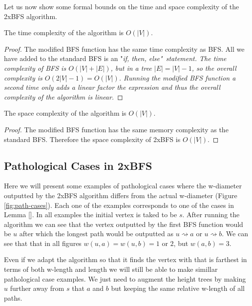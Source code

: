Let us now show some formal bounds on the time and space complexity of the 2xBFS algorithm.

\begin{lem} The time complexity of the algorithm is $O(|V|)$. \end{lem}

\begin{proof}
    The modified BFS function has the same time complexity as BFS. All we have added to the standard BFS is an "\em if, then, else\em"~statement. The time complexity of BFS is $O(|V| + |E|)$, but in a tree $|E| = |V| - 1$, so the overall complexity is $O(2|V| - 1) = O(|V|)$.
    Running the modified BFS function a second time only adds a linear factor the expression and thus the overall complexity of the algorithm is linear.
\end{proof}

\begin{lem} The space complexity of the algorithm is $O(|V|)$. \end{lem}

\begin{proof}
    The modified BFS function has the same memory complexity as the standard BFS. Therefore the space complexity of 2xBFS is $O(|V|)$.
\end{proof}

\subsection{Pathological Cases in 2xBFS}

Here we will present some examples of pathological cases where the w-diameter outputted by the 2xBFS algorithm differs from the actual w-diameter (Figure \ref{fig:path-cases}). Each one of the examples corresponds to one of the cases in Lemma []. In all examples the initial vertex is taked to be $s$. After running the algorithm we can see that the vertex outputted by the first BFS function would be $u$ after which the longest path would be outputted as $u \rightsquigarrow a$ or $u \rightsquigarrow b$. We can see that that in all figures $w(u, a) = w(u, b) = 1 \text{ or } 2$, but $w(a, b) = 3$.

Even if we adapt the algorithm so that it finds the vertex with that is farthest in terms of both w-length and length we will still be able to make simillar pathological case examples. We just need to augment the height trees by making $u$ further away from $s$ that $a$ and $b$ but keeping the same relative w-length of all paths.

